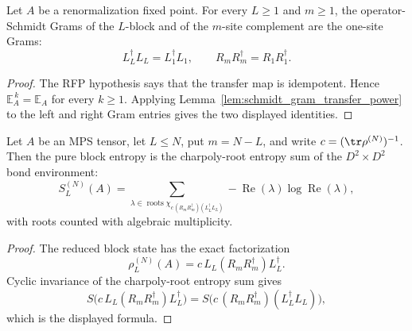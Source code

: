 \begin{lemma}
    \label{lem:rfp_schmidt_gram_collapse}
    \leanok
    Let $A$ be a renormalization fixed point. For every $L\ge 1$ and
    $m\ge 1$, the operator-Schmidt Grams of the $L$-block and of the
    $m$-site complement are the one-site Grams:
    \[
        L_L^\dagger L_L = L_1^\dagger L_1,
        \qquad
        R_mR_m^\dagger = R_1R_1^\dagger .
    \]
\end{lemma}
\begin{proof}\leanok
    The RFP hypothesis says that the transfer map is idempotent. Hence
    $\mathbb{E}_A^{\,k}=\mathbb{E}_A$ for every $k\ge 1$. Applying
    Lemma~\ref{lem:schmidt_gram_transfer_power} to the left and right Gram
    entries gives the two displayed identities.
\end{proof}

\begin{lemma}
    \label{lem:pure_block_entropy_env_charpoly}
    \leanok
    Let $A$ be an MPS tensor, let $L\le N$, put $m=N-L$, and write
    $c=(\tr\rho^{(N)})^{-1}$. Then the pure block entropy is the
    charpoly-root entropy sum of the $D^2\times D^2$ bond environment:
    \[
        S_L^{(N)}(A)
        =
        \sum_{\lambda\in
            \operatorname{roots}\chi_{c\,(R_mR_m^\dagger)(L_L^\dagger L_L)}}
            -\operatorname{Re}(\lambda)\log\operatorname{Re}(\lambda),
    \]
    with roots counted with algebraic multiplicity.
\end{lemma}
\begin{proof}\leanok
    The reduced block state has the exact factorization
    \[
        \rho_L^{(N)}(A)
        =
        c\,L_L(R_mR_m^\dagger)L_L^\dagger .
    \]
    Cyclic invariance of the charpoly-root entropy sum gives
    \[
        S\bigl(c\,L_L(R_mR_m^\dagger)L_L^\dagger\bigr)
            =
        S\bigl(c\,(R_mR_m^\dagger)(L_L^\dagger L_L)\bigr),
    \]
    which is the displayed formula.
\end{proof}

